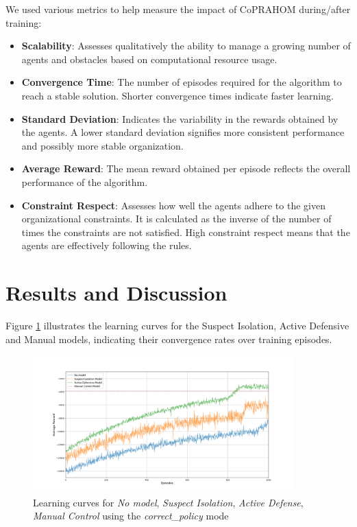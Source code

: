 \documentclass[conference]{IEEEtran}
\begin{document}
We used various metrics to help measure the impact of CoPRAHOM during/after training:
\begin{itemize}
    \item \textbf{Scalability}: Assesses qualitatively the ability to manage a growing number of agents and obstacles based on computational resource usage.
    \item \textbf{Convergence Time}: The number of episodes required for the algorithm to reach a stable solution. Shorter convergence times indicate faster learning.
    \item \textbf{Standard Deviation}: Indicates the variability in the rewards obtained by the agents. A lower standard deviation signifies more consistent performance and possibly more stable organization.
    \item \textbf{Average Reward}: The mean reward obtained per episode reflects the overall performance of the algorithm.
    \item \textbf{Constraint Respect}: Assesses how well the agents adhere to the given organizational constraints. It is calculated as the inverse of the number of times the constraints are not satisfied. High constraint respect means that the agents are effectively following the rules.
\end{itemize}


\section{Results and Discussion}\label{sec:results_and_discussion}

Figure \ref{fig:learning_curves} illustrates the learning curves for the Suspect Isolation, Active Defensive and Manual models, indicating their convergence rates over training episodes.

\begin{figure}[ht]
    \centering
    \includegraphics[width=0.9\textwidth]{figures/learning_curves.png}
    \caption{Learning curves for \textit{No model}, \textit{Suspect Isolation}, \textit{Active Defense}, \textit{Manual Control} using the \textit{correct\_policy} mode}
    \label{fig:learning_curves}
\end{figure}
\end{document}
